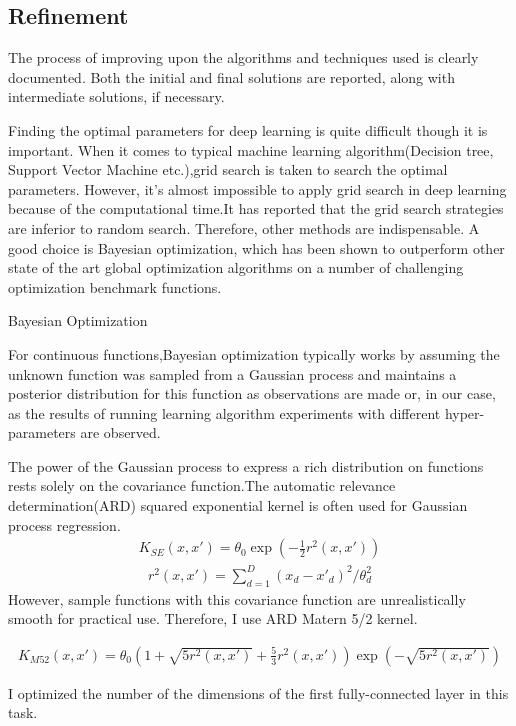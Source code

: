 \subsection{Refinement}
The process of improving upon the algorithms and techniques used is clearly documented. Both the initial and final solutions are reported, along with intermediate solutions, if necessary.

Finding the optimal parameters for deep learning is quite difficult though it is important. When it comes to typical machine learning algorithm(Decision tree, Support Vector Machine etc.),grid search is taken to search the optimal parameters. However, it's almost impossible to apply grid search in deep learning because of the computational time.It has reported that the grid search strategies are inferior to random search.\cite{Random} Therefore, other methods are indispensable. A good choice is Bayesian optimization, which has been shown to outperform other state of the art global optimization algorithms on a number of challenging optimization benchmark functions.

Bayesian Optimization\cite{Bayesian Optimization}

For continuous functions,Bayesian optimization typically works by assuming the unknown function was sampled from a Gaussian process and maintains a posterior distribution for this function as observations are made or, in our case, as the results of running learning algorithm experiments with different hyper-parameters are observed. 

The power of the Gaussian process to express a rich distribution on functions rests solely on the covariance function.The automatic relevance determination(ARD) squared exponential kernel is often used for Gaussian process regression.
\begin{eqnarray}
K_{SE}(x,x')=\theta_{0}\exp{(-\frac{1}{2}r^2(x,x'))} 
\end{eqnarray}
\begin{eqnarray}
r^2(x,x')=\sum^{D}_{d=1}(x_{d}-x'_{d})^2/\theta^2_{d}
\end{eqnarray}
However, sample functions with this covariance function are unrealistically smooth for practical use. Therefore,  I use ARD Matern 5/2 kernel.

\begin{eqnarray}
K_{M52}(x,x')=\theta_{0}(1+\sqrt{5r^2(x,x')}+\frac{5}{3}r^2(x,x'))\exp{(-\sqrt{5r^2(x,x')})}
\end{eqnarray}

I optimized the number of the dimensions of the first fully-connected layer in this task.